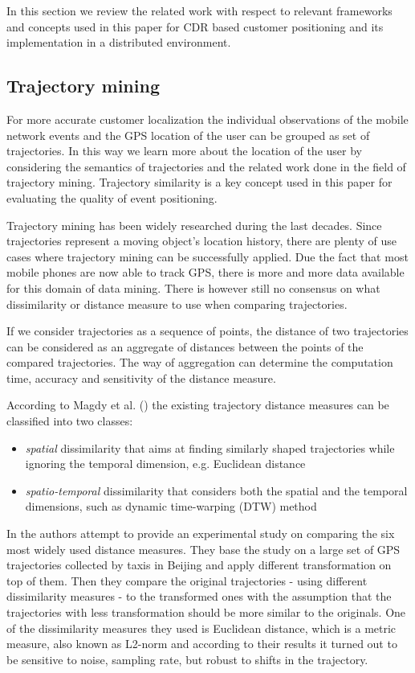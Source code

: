 In this section we review the related work with respect to relevant frameworks and concepts used in this paper for CDR based customer positioning and its implementation in a distributed environment.

\subsection{Trajectory mining}
For more accurate customer localization the individual observations of the mobile network events and the GPS location of the user can be grouped as set of trajectories. In this way we learn more about the location of the user by considering the semantics of trajectories and the related work done in the field of trajectory mining. Trajectory similarity is a key concept used in this paper for evaluating the quality of event positioning.

Trajectory mining has been widely researched during the last decades. Since trajectories represent a moving object's location history, there are plenty of use cases where trajectory mining can be successfully applied.  Due the fact that most mobile phones are now able to track GPS, there is more and more data available for this domain of data mining. There is however still no consensus on what dissimilarity or distance measure to use when comparing trajectories.

If we consider trajectories as a sequence of points, the distance of two trajectories can be considered as an aggregate of distances between the points of the compared trajectories. The way of aggregation can determine the computation time, accuracy and sensitivity of the distance measure. 

According to Magdy et al. (\cite{traj-sim-rev}) the existing trajectory distance measures can be classified into two classes: 
\begin{itemize}
    \item \textit{spatial} dissimilarity that aims at finding similarly  shaped trajectories while ignoring the temporal dimension, e.g. Euclidean distance
    \item \textit{spatio-temporal} dissimilarity that considers both the spatial and the temporal dimensions, such as dynamic time-warping (DTW) method
\end{itemize}

In \cite{traj-sim} the authors attempt to provide an experimental study on comparing the six most widely used distance measures. They base the study on a large set of GPS trajectories collected by taxis in Beijing and apply different transformation on top of them. Then they compare the original trajectories - using different dissimilarity measures - to the transformed ones with the assumption that the trajectories with less transformation should be more similar to the originals. One of the dissimilarity measures they used is Euclidean distance, which is a metric measure, also known as L2-norm and according to their results it turned out to be sensitive to noise, sampling rate, but robust to shifts in the trajectory.

